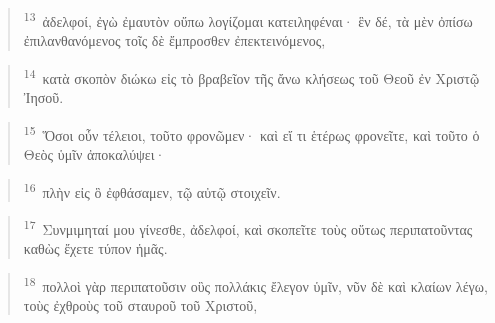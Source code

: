 \documentclass{article}
\newcommand{\currentverse}{1} %
\newcommand{\setcurrentverse}[1]{\renewcommand{\currentverse}{#1}}
\begin{document}
\begin{verse}

\setcurrentverse{13}

\setcounter{footnote}{0}

\textsuperscript{13}~ἀδελφοί, ἐγὼ ἐμαυτὸν οὔπω λογίζομαι κατειληφέναι· ἓν δέ, τὰ μὲν ὀπίσω ἐπιλανθανόμενος τοῖς δὲ ἔμπροσθεν ἐπεκτεινόμενος,

\end{verse}

\begin{verse}

\setcurrentverse{14}

\setcounter{footnote}{0}

\textsuperscript{14}~κατὰ σκοπὸν διώκω εἰς τὸ βραβεῖον τῆς ἄνω κλήσεως τοῦ Θεοῦ ἐν Χριστῷ Ἰησοῦ.

\end{verse}

\begin{verse}

\setcurrentverse{15}

\setcounter{footnote}{0}

\textsuperscript{15}~Ὅσοι οὖν τέλειοι, τοῦτο φρονῶμεν· καὶ εἴ τι ἑτέρως φρονεῖτε, καὶ τοῦτο ὁ Θεὸς ὑμῖν ἀποκαλύψει·

\end{verse}

\begin{verse}

\setcurrentverse{16}

\setcounter{footnote}{0}

\textsuperscript{16}~πλὴν εἰς ὃ ἐφθάσαμεν, τῷ αὐτῷ στοιχεῖν.

\end{verse}

\begin{verse}

\setcurrentverse{17}

\setcounter{footnote}{0}

\textsuperscript{17}~Συνμιμηταί μου γίνεσθε, ἀδελφοί, καὶ σκοπεῖτε τοὺς οὕτως περιπατοῦντας καθὼς ἔχετε τύπον ἡμᾶς.

\end{verse}

\begin{verse}

\setcurrentverse{18}

\setcounter{footnote}{0}

\textsuperscript{18}~πολλοὶ γὰρ περιπατοῦσιν οὓς πολλάκις ἔλεγον ὑμῖν, νῦν δὲ καὶ κλαίων λέγω, τοὺς ἐχθροὺς τοῦ σταυροῦ τοῦ Χριστοῦ,

\end{verse}
\end{document}
